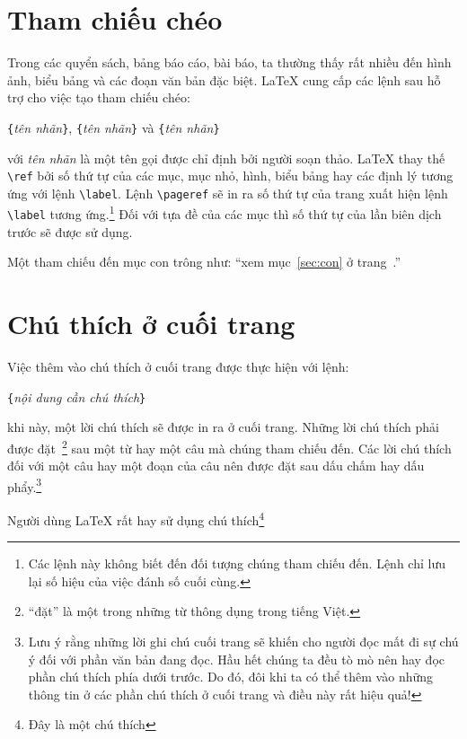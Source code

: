 \section{Tham chiếu chéo}
Trong các quyển sách, bảng báo cáo, bài báo, ta thường thấy rất nhiều  đến hình ảnh, biểu bảng và các đoạn văn bản đặc biệt. \LaTeX{} cung cấp các lệnh sau hỗ trợ cho việc tạo tham chiếu chéo:
\begin{lscommand}
\verb|{|\emph{tên nhãn}\verb|}|,
\verb|{|\emph{tên nhãn}\verb|}| và
\verb|{|\emph{tên nhãn}\verb|}|
\end{lscommand}
\noindent với \emph{tên nhãn} là một tên gọi được chỉ định bởi người soạn thảo. \LaTeX{} thay thế \verb|\ref| bởi số thứ tự của các mục, mục nhỏ, hình, biểu bảng hay các định lý tương ứng với lệnh \verb|\label|. Lệnh \verb|\pageref| sẽ in ra số thứ tự của trang xuất hiện lệnh \verb|\label| tương ứng.\footnote{Các lệnh này không biết đến đối tượng chúng tham chiếu đến. Lệnh  chỉ lưu lại số hiệu của việc đánh số cuối cùng.} Đối với tựa đề của các mục thì số thứ tự của lần biên dịch trước sẽ được sử  dụng.
\begin{example}
Một tham chiếu đến mục con
\label{sec:con} trông như: ``xem
mục~\ref{sec:con} ở
trang~\pageref{sec:con}.''
\end{example}

\section{Chú thích ở cuối trang}
Việc thêm vào chú thích ở cuối trang được thực hiện với lệnh:
\begin{lscommand}
\verb|{|\emph{nội dung cần chú thích}\verb|}|
\end{lscommand}
\noindent khi này, một lời chú thích sẽ được in ra ở cuối trang. Những lời chú thích phải được đặt~\footnote{``đặt'' là một trong những từ thông dụng trong tiếng Việt.} sau một từ hay một câu mà chúng tham chiếu đến. Các lời chú thích đối với một câu hay một đoạn của câu nên được đặt sau dấu chấm hay dấu phẩy.\footnote{Lưu ý rằng những lời ghi chú cuối trang sẽ khiến cho người đọc mất đi sự chú ý đối với phần văn bản đang đọc. Hầu hết chúng ta đều tò mò nên hay đọc phần chú thích phía dưới trước. Do đó, đôi khi ta có thể thêm vào những thông tin ở các phần chú thích ở cuối trang và điều này rất hiệu quả!\footnotemark}
\begin{example}
Người dùng \LaTeX{} rất hay sử dụng chú thích\footnote{Đây là một chú thích}
\end{example}

